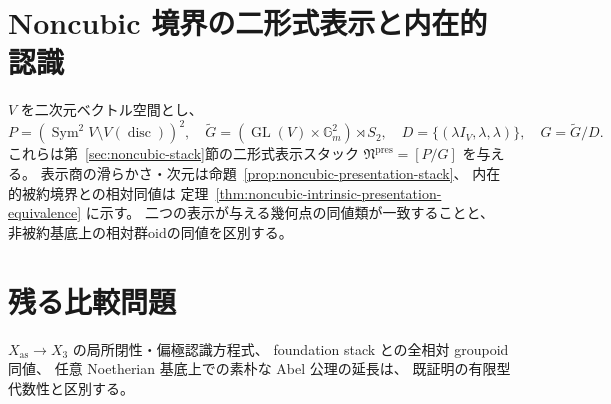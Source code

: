 \documentclass[a4paper,11pt]{ltjsarticle}
\numberwithin{equation}{section}
\theoremstyle{plain}
\theoremstyle{definition}
\theoremstyle{remark}
\begin{document}

















\section{Noncubic 境界の二形式表示と内在的認識}\label{sec:moduli-boundary}
$V$ を二次元ベクトル空間とし、
\[
 P=(\operatorname{Sym}^2V\setminus V(\operatorname{disc}))^2,\quad
 \widetilde G=(\operatorname{GL}(V)\times\mathbb G_m^2)\rtimes S_2,\quad
 D=\{(\lambda I_V,\lambda,\lambda)\},\quad G=\widetilde G/D.
\]
これらは第~\ref{sec:noncubic-stack}節の二形式表示スタック
$\mathfrak N^{\mathrm{pres}}=[P/G]$ を与える。
表示商の滑らかさ・次元は命題~\ref{prop:noncubic-presentation-stack}、
内在的被約境界との相対同値は
定理~\ref{thm:noncubic-intrinsic-presentation-equivalence} に示す。
二つの表示が与える幾何点の同値類が一致することと、
非被約基底上の相対群oidの同値を区別する。







\section{残る比較問題}\label{sec:moduli-remaining}
$X_{\mathrm{as}}\to X_3$ の局所閉性・偏極認識方程式、
foundation stack との全相対 groupoid 同値、
任意 Noetherian 基底上での素朴な Abel 公理の延長は、
既証明の有限型代数性と区別する。



\end{document}
